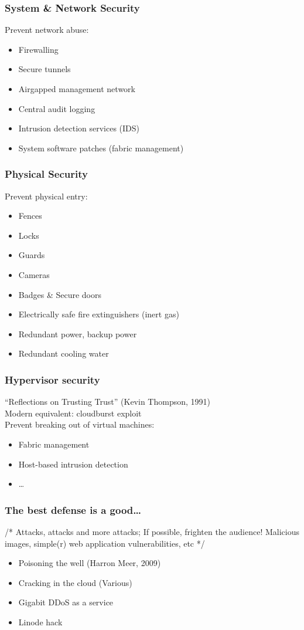 \documentclass{beamer}
\begin{document}
\begin{frame}
    \frametitle{System \& Network Security}
    Prevent network abuse:
    \begin{itemize}
      \item Firewalling
      \item Secure tunnels %
      \item Airgapped management network
      \item Central audit logging
      \item Intrusion detection services (IDS)
      \item System software patches (fabric management)
    \end{itemize}
\end{frame}

\begin{frame}
    \frametitle{Physical Security}
    Prevent physical entry:
    \begin{itemize}
      \item Fences
      \item Locks
      \item Guards
      \item Cameras
      \item Badges \& Secure doors
      \item Electrically safe fire extinguishers (inert gas)
      \item Redundant power, backup power
      \item Redundant cooling water
    \end{itemize}
\end{frame}

\begin{frame}
    \frametitle{Hypervisor security}
    ``Reflections on Trusting Trust'' (Kevin Thompson, 1991) \\
    Modern equivalent: cloudburst exploit \\
    Prevent breaking out of virtual machines:
    \begin{itemize}
      \item Fabric management
      \item Host-based intrusion detection
      \item \dots
    \end{itemize}
\end{frame}

\begin{frame}
    \frametitle{The best defense is a good\dots}
    /* Attacks, attacks and more attacks; If possible, frighten the audience!
    Malicious images, simple(r) web application vulnerabilities, etc */
    \begin{itemize}
      \item Poisoning the well (Harron Meer, 2009)
      \item Cracking in the cloud (Various) %
      \item Gigabit DDoS as a service %
      \item Linode hack
    \end{itemize}
\end{frame}
\end{document}
